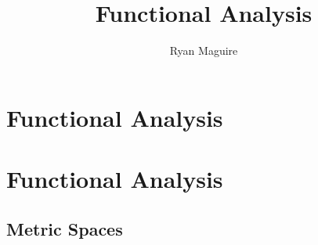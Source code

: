 \documentclass[crop=false,class=book,oneside]{standalone}                      %
\begin{document}
    \ifx\ifmain\undefined
        \title{Functional Analysis}
        \author{Ryan Maguire}
        \date{\vspace{-5ex}}
        \maketitle
        \tableofcontents
        \clearpage
        \chapter*{Functional Analysis}
        \vspace{10ex}
        \setcounter{chapter}{1}
    \else
        \chapter{Functional Analysis}
    \fi
    \section{Metric Spaces}
\end{document}
